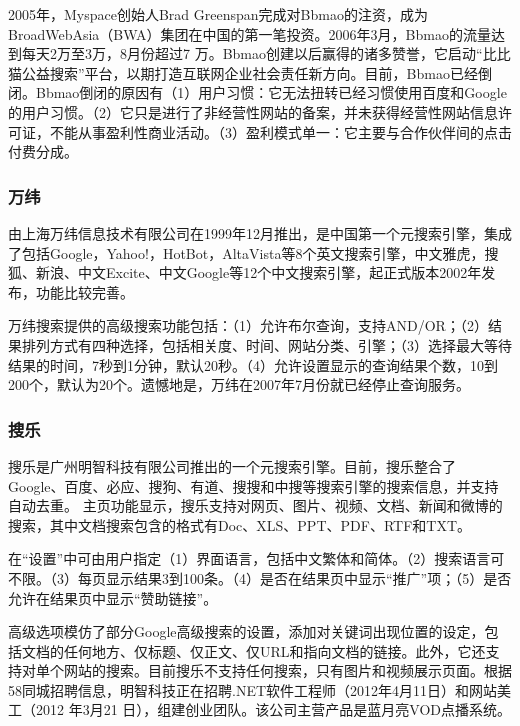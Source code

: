 2005年，Myspace创始人Brad Greenspan完成对Bbmao的注资，成为BroadWebAsia（BWA）集团在中国的第一笔投资。2006年3月，Bbmao的流量达到每天2万至3万，8月份超过7 万。Bbmao创建以后赢得的诸多赞誉，它启动“比比猫公益搜索”平台，以期打造互联网企业社会责任新方向。目前，Bbmao已经倒闭。Bbmao倒闭的原因有（1）用户习惯：它无法扭转已经习惯使用百度和Google的用户习惯。（2）它只是进行了非经营性网站的备案，并未获得经营性网站信息许可证，不能从事盈利性商业活动。（3）盈利模式单一：它主要与合作伙伴间的点击付费分成。

\subsubsection{万纬}
由上海万纬信息技术有限公司在1999年12月推出，是中国第一个元搜索引擎，集成了包括Google，Yahoo!，HotBot，AltaVista等8个英文搜索引擎，中文雅虎，搜狐、新浪、中文Excite、中文Google等12个中文搜索引擎，起正式版本2002年发布，功能比较完善。

万纬搜索提供的高级搜索功能包括：（1）允许布尔查询，支持AND/OR；（2）结果排列方式有四种选择，包括相关度、时间、网站分类、引擎；（3）选择最大等待结果的时间，7秒到1分钟，默认20秒。（4）允许设置显示的查询结果个数，10到200个，默认为20个。遗憾地是，万纬在2007年7月份就已经停止查询服务。

\subsubsection{搜乐}
搜乐是广州明智科技有限公司推出的一个元搜索引擎。目前，搜乐整合了Google、百度、必应、搜狗、有道、搜搜和中搜等搜索引擎的搜索信息，并支持自动去重。
主页功能显示，搜乐支持对网页、图片、视频、文档、新闻和微博的搜索，其中文档搜索包含的格式有Doc、XLS、PPT、PDF、RTF和TXT。

在“设置”中可由用户指定（1）界面语言，包括中文繁体和简体。（2）搜索语言可不限。（3）每页显示结果3到100条。（4）是否在结果页中显示“推广”项；（5）是否允许在结果页中显示“赞助链接”。

高级选项模仿了部分Google高级搜索的设置，添加对关键词出现位置的设定，包括文档的任何地方、仅标题、仅正文、仅URL和指向文档的链接。此外，它还支持对单个网站的搜索。目前搜乐不支持任何搜索，只有图片和视频展示页面。根据58同城招聘信息，明智科技正在招聘.NET软件工程师（2012年4月11日）和网站美工（2012 年3月21 日），组建创业团队。该公司主营产品是蓝月亮VOD点播系统。

